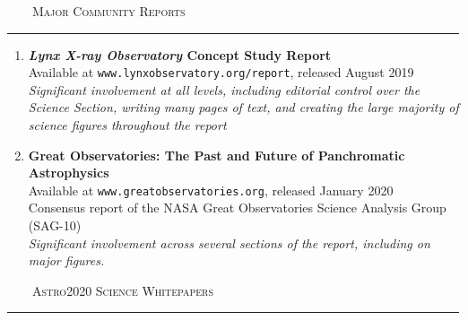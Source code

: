 \documentclass[11pt]{article}
\makeatletter
\def\vhrulefill#1{\leavevmode\leaders\hrule\@height#1\hfill \kern\z@}
\makeatother
\begin{document}
\noindent \textsc{ ~~~~Major Community Reports} \vhrulefill{0.4pt}


\begin{enumerate}

\item \textbf{\textit{Lynx X-ray Observatory} Concept Study Report}\\
Available at \texttt{www.lynxobservatory.org/report}, released August 2019\\
\textit{Significant involvement at all levels, including editorial control over the Science Section,
writing many pages of text, and creating the large majority of science figures throughout the report}

\item \textbf{Great Observatories: The Past and Future of Panchromatic Astrophysics} \\
Available at \texttt{www.greatobservatories.org}, released January 2020\\
Consensus report of the NASA Great Observatories Science Analysis Group (SAG-10)\\
\textit{Significant involvement across several sections of the report, including on major figures.} \\


\end{enumerate}

\noindent \textsc{ ~~~~Astro2020 Science Whitepapers} \vhrulefill{0.4pt}
\end{document}
